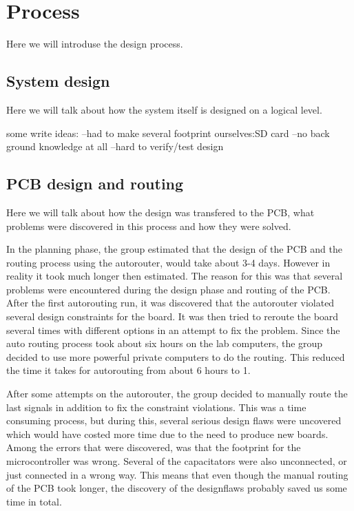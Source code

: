 \section {Process}

Here we will introduse the design process.

\subsection{System design} \label{pcb:process:ss:system_design}

Here we will talk about how the system itself is designed on a logical level.

some write ideas:
--had to make several footprint ourselves:SD card
--no back ground knowledge at all
--hard to verify/test design

\subsection{PCB design and routing} \label{pcb:process:ss:pcb_design_and_soldering}

Here we will talk about how the design was transfered to the PCB, what problems were discovered in this process and how they were solved.

In the planning phase, the group estimated that the design of the PCB and the routing process using the autorouter, would take about 3-4 days. However in reality it took much longer then estimated. The reason for this was that several
problems were encountered during the design phase and routing of the PCB. After the first autorouting run, it was discovered that the autorouter violated several design constraints for the board. It was then tried to reroute the board several times
with different options in an attempt to fix the problem. Since the auto routing process took about six hours on the lab computers, the group decided to use more powerful private computers to do the routing. This reduced the time it takes for autorouting from about 6 hours to 1.

After some attempts on the autorouter, the group decided to manually route the last signals in addition to fix the constraint violations. This was a time consuming process, but during this, several serious design flaws were uncovered which would have costed
more time due to the need to produce new boards. Among the errors that were discovered, was that the footprint for the microcontroller was wrong. Several of the capacitators were also unconnected, or just connected in a wrong way. This means that even though the manual routing of the PCB took longer,
the discovery of the designflaws probably saved us some time in total.
